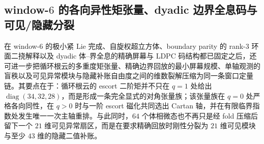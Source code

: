\subsection{window-\texorpdfstring{$6$}{6} 的各向异性矩张量、dyadic 边界全息码与可见/隐藏分裂}\label{subsec:conclusion-window6-moment-ldpc-holography-hidden-split}
在 window-\(6\) 的极小紧 Lie 完成、自旋权超立方体、boundary parity 的 rank-\(3\) 环面二挠解释以及 dyadic 体--界全息的精确屏幕与 LDPC 码结构都已固定之后，还可进一步把循环根云的多重度矩张量、精确边界回放的最小屏幕规模、单轴观测的盲秩以及可见异常模块与隐藏补账自由度之间的维数裂解压缩为同一条窗口定量链。其要点在于：循环根云的 escort 二阶矩并不只在 \(q=1\) 处给出 \(\operatorname{diag}(34,32,28)\)，而是形成一条完全显式的对角张量族；该张量族在 \(q=0\) 处严格各向同性，在 \(q>0\) 时与一阶 escort 磁化共同选出 Cartan 轴，并在有限临界指数处发生唯一一次主轴重排。与此同时，\(64\) 个体相微态也不再只是经 fold 压缩后留下一个 \(21\) 维可见异常扇区，而是在要求精确回放时刚性分裂为 \(21\) 维可见模块与至少 \(43\) 维的隐藏二值补账。

